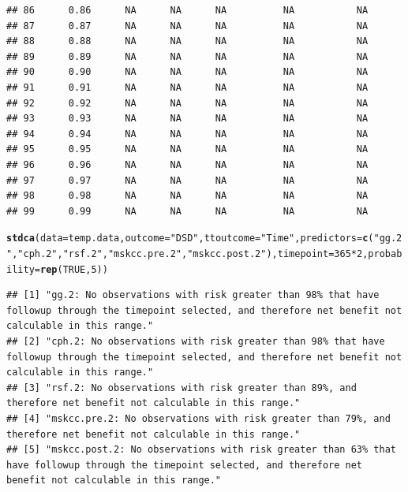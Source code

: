 \documentclass{article}\usepackage[]{graphicx}\usepackage[]{color}
\makeatletter
\newcommand{\hlnum}[1]{\textcolor[rgb]{0.686,0.059,0.569}{#1}}%
\newcommand{\hlstr}[1]{\textcolor[rgb]{0.192,0.494,0.8}{#1}}%
\newcommand{\hlopt}[1]{\textcolor[rgb]{0,0,0}{#1}}%
\newcommand{\hlstd}[1]{\textcolor[rgb]{0.345,0.345,0.345}{#1}}%
\newcommand{\hlkwc}[1]{\textcolor[rgb]{0.333,0.667,0.333}{#1}}%
\newcommand{\hlkwd}[1]{\textcolor[rgb]{0.737,0.353,0.396}{\textbf{#1}}}%
\newenvironment{kframe}{%
 \def\at@end@of@kframe{}%
 \ifinner\ifhmode%
  \def\at@end@of@kframe{\end{minipage}}%
  \begin{minipage}{\columnwidth}%
 \fi\fi%
 \def\FrameCommand##1{\hskip\@totalleftmargin \hskip-\fboxsep
 \colorbox{shadecolor}{##1}\hskip-\fboxsep
     \hskip-\linewidth \hskip-\@totalleftmargin \hskip\columnwidth}%
 \MakeFramed {\advance\hsize-\width
   \@totalleftmargin\z@ \linewidth\hsize
   \@setminipage}}%
 {\par\unskip\endMakeFramed%
 \at@end@of@kframe}
\newenvironment{knitrout}{}{} %
\makeatother
\begin{document}
\begin{knitrout}
\begin{kframe}
\begin{verbatim}
## 86      0.86      NA      NA      NA          NA           NA
## 87      0.87      NA      NA      NA          NA           NA
## 88      0.88      NA      NA      NA          NA           NA
## 89      0.89      NA      NA      NA          NA           NA
## 90      0.90      NA      NA      NA          NA           NA
## 91      0.91      NA      NA      NA          NA           NA
## 92      0.92      NA      NA      NA          NA           NA
## 93      0.93      NA      NA      NA          NA           NA
## 94      0.94      NA      NA      NA          NA           NA
## 95      0.95      NA      NA      NA          NA           NA
## 96      0.96      NA      NA      NA          NA           NA
## 97      0.97      NA      NA      NA          NA           NA
## 98      0.98      NA      NA      NA          NA           NA
## 99      0.99      NA      NA      NA          NA           NA
\end{verbatim}
\begin{alltt}
\hlkwd{stdca}\hlstd{(}\hlkwc{data} \hlstd{= temp.data,} \hlkwc{outcome} \hlstd{=} \hlstr{"DSD"}\hlstd{,} \hlkwc{ttoutcome} \hlstd{=} \hlstr{"Time"}\hlstd{,} \hlkwc{predictors} \hlstd{=} \hlkwd{c}\hlstd{(}\hlstr{"gg.2"}\hlstd{,} \hlstr{"cph.2"}\hlstd{,} \hlstr{"rsf.2"}\hlstd{,} \hlstr{"mskcc.pre.2"}\hlstd{,} \hlstr{"mskcc.post.2"}\hlstd{),} \hlkwc{timepoint} \hlstd{=} \hlnum{365}\hlopt{*}\hlnum{2}\hlstd{,} \hlkwc{probability} \hlstd{=} \hlkwd{rep}\hlstd{(}\hlnum{TRUE}\hlstd{,} \hlnum{5}\hlstd{))}
\end{alltt}
\begin{verbatim}
## [1] "gg.2: No observations with risk greater than 98% that have followup through the timepoint selected, and therefore net benefit not calculable in this range."        
## [2] "cph.2: No observations with risk greater than 98% that have followup through the timepoint selected, and therefore net benefit not calculable in this range."       
## [3] "rsf.2: No observations with risk greater than 89%, and therefore net benefit not calculable in this range."                                                         
## [4] "mskcc.pre.2: No observations with risk greater than 79%, and therefore net benefit not calculable in this range."                                                   
## [5] "mskcc.post.2: No observations with risk greater than 63% that have followup through the timepoint selected, and therefore net benefit not calculable in this range."
\end{verbatim}
\end{kframe}


\end{knitrout}
\end{document}
